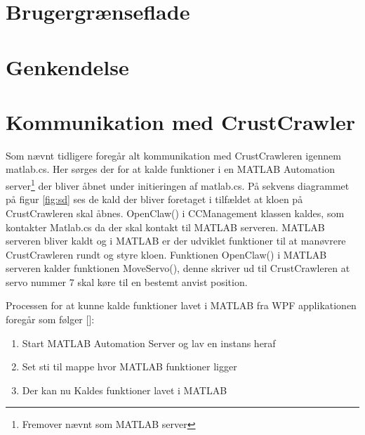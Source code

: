 \section{Brugergrænseflade}

\section{Genkendelse}


\section{Kommunikation med CrustCrawler}
\label{sssec:ktc}
Som nævnt tidligere foregår alt kommunikation med CrustCrawleren igennem matlab.cs. Her sørges der for at kalde funktioner i en MATLAB Automation server\footnote{Fremover nævnt som MATLAB server} der bliver åbnet under initieringen af matlab.cs. På sekvens diagrammet på figur \ref{fig:sd} ses de kald der bliver foretaget i tilfældet at kloen på CrustCrawleren skal åbnes. OpenClaw() i CCManagement klassen kaldes, som kontakter Matlab.cs da der skal kontakt til MATLAB serveren. MATLAB serveren bliver kaldt og i MATLAB er der udviklet funktioner til at manøvrere CrustCrawleren rundt og styre kloen. Funktionen OpenClaw() i MATLAB serveren kalder funktionen MoveServo(), denne skriver ud til CrustCrawleren at servo nummer 7 skal køre til en bestemt anvist position.


Processen for at kunne kalde funktioner lavet i MATLAB fra WPF applikationen foregår som følger [\cite{MatlabC}]:
\begin{enumerate}
	\item Start MATLAB Automation Server og lav en instans heraf
	\item Set sti til mappe hvor MATLAB funktioner ligger
	\item Der kan nu Kaldes funktioner lavet i MATLAB
\end{enumerate}
